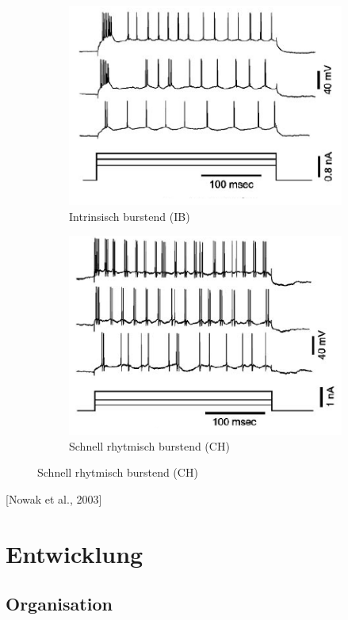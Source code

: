 \begin{frame}
  \begin{figure}
    \begin{subfigure}{.5\textwidth}
      \centering
      \includegraphics*[width=0.7\linewidth]{genetic/nowak-ib.png}
      \caption*{Intrinsisch burstend (IB)}
    \end{subfigure}%
    \begin{subfigure}{.5\textwidth}
      \centering
      \includegraphics*[width=0.7\linewidth]{genetic/nowak-ch.png}
      \caption*{Schnell rhytmisch burstend (CH)}
    \end{subfigure}
  \end{figure}
  {\scriptsize [Nowak et al., 2003]}
\end{frame}


\section{Entwicklung}

\subsection{Organisation}

